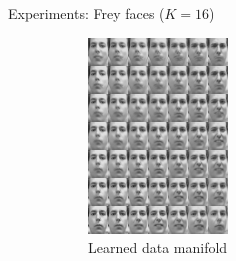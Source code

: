 \documentclass[unicode,11pt]{beamer}
\begin{document}
\begin{frame}[fragile]{Experiments: Frey faces ($K = 16$)}
  \begin{figure}
    \centering
    \begin{subfigure}[b]{.4\linewidth}
      \centering
      \includegraphics[width=.8\linewidth]{images/nf_frey_B400_E8000_N560_L2_H200_F16_C_manifold_8}
      \caption{Learned data manifold}
    \end{subfigure}
    \hspace{1em}
    \begin{subfigure}[b]{.4\linewidth}
      \centering

\end{subfigure}
\end{figure}
\end{frame}
\end{document}
